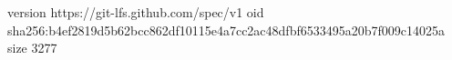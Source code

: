 version https://git-lfs.github.com/spec/v1
oid sha256:b4ef2819d5b62bcc862df10115e4a7cc2ac48dfbf6533495a20b7f009c14025a
size 3277
